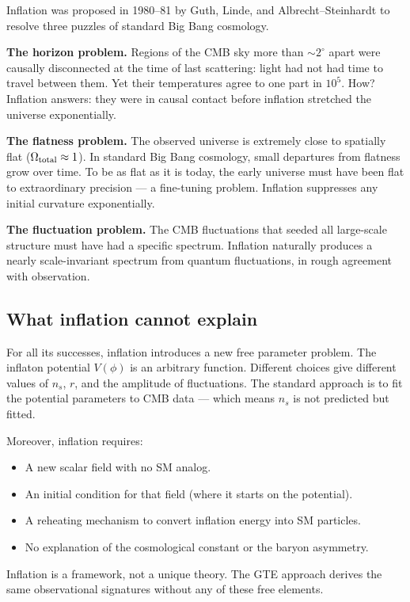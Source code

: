 \documentclass[11pt,a4paper]{article}
\begin{document}
Inflation was proposed in 1980--81 by Guth, Linde, and Albrecht--Steinhardt
to resolve three puzzles of standard Big Bang cosmology.

\textbf{The horizon problem.}
Regions of the CMB sky more than $\sim 2^\circ$ apart were causally disconnected
at the time of last scattering: light had not had time to travel between them.
Yet their temperatures agree to one part in $10^5$.
How?
Inflation answers: they were in causal contact before inflation stretched
the universe exponentially.

\textbf{The flatness problem.}
The observed universe is extremely close to spatially flat ($\Omega_{\rm total} \approx 1$).
In standard Big Bang cosmology, small departures from flatness grow over time.
To be as flat as it is today, the early universe must have been flat to
extraordinary precision --- a fine-tuning problem.
Inflation suppresses any initial curvature exponentially.

\textbf{The fluctuation problem.}
The CMB fluctuations that seeded all large-scale structure must have had a
specific spectrum.
Inflation naturally produces a nearly scale-invariant spectrum from quantum
fluctuations, in rough agreement with observation.

\subsection{What inflation cannot explain}

For all its successes, inflation introduces a new free parameter problem.
The inflaton potential $V(\phi)$ is an arbitrary function.
Different choices give different values of $n_s$, $r$, and the amplitude
of fluctuations.
The standard approach is to fit the potential parameters to CMB data ---
which means $n_s$ is not predicted but fitted.

Moreover, inflation requires:
\begin{itemize}[itemsep=2pt]
  \item A new scalar field with no SM analog.
  \item An initial condition for that field (where it starts on the potential).
  \item A reheating mechanism to convert inflation energy into SM particles.
  \item No explanation of the cosmological constant or the baryon asymmetry.
\end{itemize}

Inflation is a framework, not a unique theory.
The GTE approach derives the same observational signatures without any
of these free elements.
\end{document}
